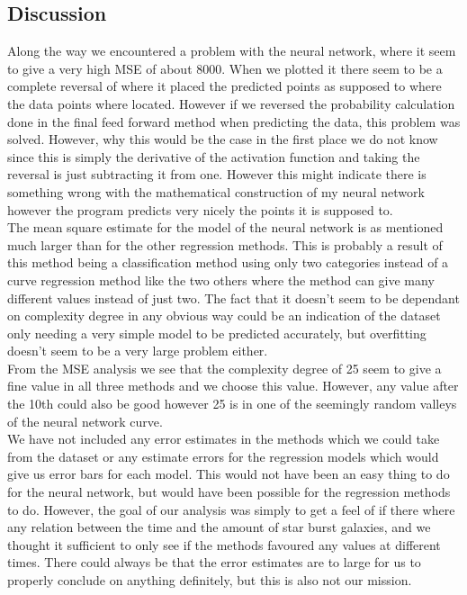 \documentclass[11pt, A4paper, english]{article}
\begin{document}
\begin{multicols}{2}
		\section{Discussion}
Along the way we encountered a problem with the neural network, where it seem to give a very high MSE of about $8000$. When we plotted it there seem to be a complete reversal of where it placed the predicted points as supposed to where the data points where located. However if we reversed the probability calculation done in the final feed forward method when predicting the data, this problem was solved. However, why this would be the case in the first place we do not know since this is simply the derivative of the activation function and taking the reversal is just subtracting it from one. However this might indicate there is something wrong with the mathematical construction of my neural network however the program predicts very nicely the points it is supposed to. \\
The mean square estimate for the model of the neural network is as mentioned much larger than for the other regression methods. This is probably a result of this method being a classification method using only two categories instead of a curve regression method like the two others where the method can give many different values instead of just two. The fact that it doesn't seem to be dependant on complexity degree in any obvious way could be an indication of the dataset only needing a very simple model to be predicted accurately, but overfitting doesn't seem to be a very large problem either. \\
From the MSE analysis we see that the complexity degree of 25 seem to give a fine value in all three methods and we choose this value. However, any value after the 10th could also be good however 25 is in one of the seemingly random valleys of the neural network curve. \\
We have not included any error estimates in the methods which we could take from the dataset or any estimate errors for the regression models which would give us error bars for each model. This would not have been an easy thing to do for the neural network, but would have been possible for the regression methods to do. However, the goal of our analysis was simply to get a feel of if there where any relation between the time and the amount of star burst galaxies, and we thought it sufficient to only see if the methods favoured any values at different times. There could always be that the error estimates are to large for us to properly conclude on anything definitely, but this is also not our mission. \\

\end{multicols}
\end{document}
